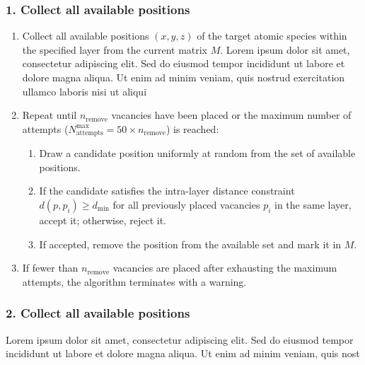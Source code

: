 \documentclass{article}
\begin{document}
\subsubsection*{1. Collect all available positions}

\begin{enumerate}[label=\textbf{Step \arabic*.},leftmargin=*,itemsep=4pt]
\item Collect all available positions $(x, y, z)$ of the target atomic species within the specified layer from the current matrix $M$.
Lorem ipsum dolor sit amet, consectetur adipiscing elit. Sed do eiusmod tempor incididunt ut labore et dolore magna aliqua. Ut enim ad minim veniam, quis nostrud exercitation ullamco laboris nisi ut aliqui

\item Repeat until $n_{\mathrm{remove}}$ vacancies have been placed or the maximum number of attempts ($N_{\mathrm{attempts}}^{\max} = 50 \times n_{\mathrm{remove}}$) is reached:
\begin{enumerate}[label=(\alph*),noitemsep]
\item Draw a candidate position uniformly at random from the set of available positions.
\item If the candidate satisfies the intra-layer distance constraint $d(p, p_i) \geq d_{\min}$ for all previously placed vacancies $p_i$ in the same layer, accept it; otherwise, reject it.
\item If accepted, remove the position from the available set and mark it in $M$.
\end{enumerate}

\item If fewer than $n_{\mathrm{remove}}$ vacancies are placed after exhausting the maximum attempts, the algorithm terminates with a warning.
\end{enumerate}

\subsubsection*{2. Collect all available positions}

Lorem ipsum dolor sit amet, consectetur adipiscing elit. Sed do eiusmod tempor incididunt ut labore et dolore magna aliqua. Ut enim ad minim veniam, quis nost
\end{document}
